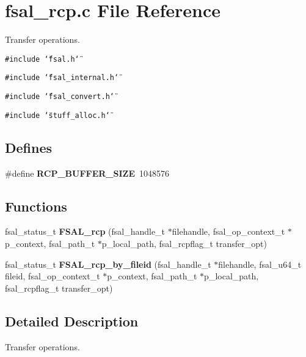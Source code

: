 \section{fsal\_\-rcp.c File Reference}
\label{fsal__rcp_8c}
Transfer operations.  


{\tt \#include \char`\"{}fsal.h\char`\"{}}\par
{\tt \#include \char`\"{}fsal\_\-internal.h\char`\"{}}\par
{\tt \#include \char`\"{}fsal\_\-convert.h\char`\"{}}\par
{\tt \#include \char`\"{}stuff\_\-alloc.h\char`\"{}}\par
\subsection*{Defines}
\begin{CompactItemize}
\item 
\#define \textbf{RCP\_\-BUFFER\_\-SIZE}~1048576\label{fsal__rcp_8c_a89c28e4de124af032c98de9f22616fe}

\end{CompactItemize}
\subsection*{Functions}
\begin{CompactItemize}
\item 
fsal\_\-status\_\-t {\bf FSAL\_\-rcp} (fsal\_\-handle\_\-t $\ast$filehandle, fsal\_\-op\_\-context\_\-t $\ast$p\_\-context, fsal\_\-path\_\-t $\ast$p\_\-local\_\-path, fsal\_\-rcpflag\_\-t transfer\_\-opt)
\item 
fsal\_\-status\_\-t \textbf{FSAL\_\-rcp\_\-by\_\-fileid} (fsal\_\-handle\_\-t $\ast$filehandle, fsal\_\-u64\_\-t fileid, fsal\_\-op\_\-context\_\-t $\ast$p\_\-context, fsal\_\-path\_\-t $\ast$p\_\-local\_\-path, fsal\_\-rcpflag\_\-t transfer\_\-opt)\label{fsal__rcp_8c_ac719f82cfdb21bc35fc2178332c202c}

\end{CompactItemize}


\subsection{Detailed Description}
Transfer operations. 

